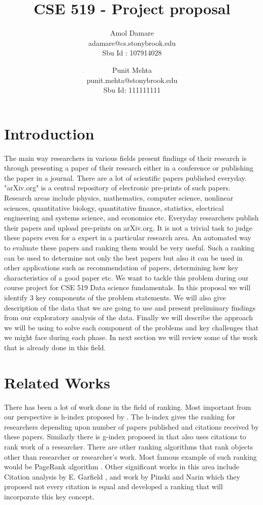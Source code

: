\documentclass[a4paper, 11pt]{article}
\begin{document}
\title{CSE 519 - Project proposal}
\author{Amol Damare \\ adamare@cs.stonybrook.edu \\Sbu Id : 107914028
\and
Punit Mehta \\ punit.mehta@stonybrook.edu \\Sbu Id: 111111111}
\maketitle
\section{Introduction}
The main way researchers in various fields present findings of their research is through presenting a paper of their research either in a conference or publishing the paper in a journal. There are a lot of scientific papers published everyday. "arXiv.org" is a central repository of electronic pre-prints of such papers. Research areas include physics, mathematics, computer science, nonlinear sciences, quantitative biology, quantitative finance, statistics, electrical engineering and systems science, and economics etc.  Everyday researchers publish their papers and upload pre-prints on arXiv.org.  It is not a trivial task to judge these papers even for a expert in a particular research area. An automated way to evaluate these papers and ranking them would be very useful. Such a ranking can be used to determine not only the best papers but also it can be used in other applications such as recommendation of papers, determining how key characteristics of a good paper etc. We want to tackle this problem during our course project for CSE 519 Data science fundamentals. In this proposal we will identify 3 key components of the problem statements. We will also give description of the data that we are going to use and present preliminary findings from our exploratory analysis of the data.  Finally we will describe the approach we will be using to solve each component of the problems and key challenges that we might face during each phase. In next section we will review some of the work that is already done in this field.
\section{Related Works}
There has been a lot of work done in the field of ranking. Most important from our perspective is h-index proposed by \cite{Hirsch}. The h-index gives the ranking for researchers depending upon number of papers published and citations received by these papers.
Similarly there is g-index proposed in \cite{gindex} that also uses citations to rank work of a researcher. There are other ranking algorithms that rank objects other than researcher or researcher's work. Most famous example of such ranking would be PageRank algorithm \cite{pagerank}. Other significant works in this area include Citation analysis by E. Garfield \cite{garfield}, and work by Pinski and Narin \cite{pinski} which they proposed not every citation is equal and developed a ranking that will incorporate this key concept.
\end{document}
